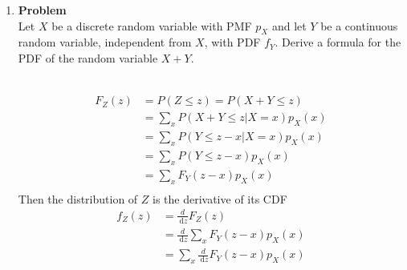 \documentclass[12pt]{article}
\newenvironment{Ex}{\textbf{Problem}\vspace{.75em}\\}{}
\newcommand{\dd}[1]{\:\mathrm{d}{#1}}
\begin{document}
\begin{enumerate}
\begin{Ex}
\begin{solution}
      \begin{equation}
        \label{eq:2-presol}
        \begin{aligned}
          F_Y(y) &= P(Y\le y) = P(F_X(x)\le y) \\
          &= \int_{\{x|F_X(X) \le y\}}f_X(x) \dd{x} \\
        \end{aligned}
      \end{equation}
      The distribution is then the derivative of the CDF of $Y$.
      \begin{equation}
        \label{eq:2-sol}
        \implies f_Y(y) = f_X(h(y)) \left|\frac{\dd{h}}{\dd{y}}(y)\right|
      \end{equation}
    \end{solution}
  \end{Ex}
\item
  \begin{Ex}
    Let $X$ be a discrete random variable with PMF $p_X$ and let $Y$
    be a continuous random variable, independent from $X$, with PDF
    $f_Y$. Derive a formula for the PDF of the random variable $X+Y$.
    \begin{solution} \hfill \vspace{.75em} \\
      \begin{equation}
        \label{eq:3-presol}
        \begin{aligned}
          F_Z(z) &= P(Z \le z) = P(X+Y \le z) \\
          &= \sum_x P(X+Y\le z | X=x)p_X(x) \\
          &= \sum_x P(Y \le z-x | X=x)p_X(x) \\
          &= \sum_x P(Y \le z-x)p_X(x) \\
          &= \sum_x F_Y(z-x)p_X(x) \\
        \end{aligned}
      \end{equation}
      Then the distribution of $Z$ is the derivative of its CDF
      \begin{equation}
        \label{eq:3-sol}
        \begin{aligned}
          f_Z(z) &= \frac{d}{\dd{z}}F_Z(z) \\
          &= \frac{d}{\dd{z}}\sum_{x}F_Y(z-x)p_X(x) \\
          &= \sum_{x}\frac{d}{\dd{z}}F_Y(z-x)p_X(x) \\

\end{aligned}
\end{equation}
\end{solution}
\end{Ex}
\end{enumerate}
\end{document}
